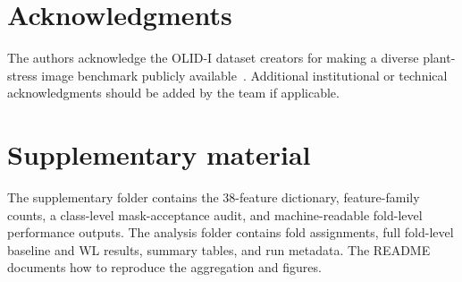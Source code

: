 \documentclass[conference]{IEEEtran}
\begin{document}


\section*{Acknowledgments}
The authors acknowledge the OLID-I dataset creators for making a diverse plant-stress image benchmark publicly available~\cite{Orka2023}. Additional institutional or technical acknowledgments should be added by the team if applicable.


\section*{Supplementary material}
The supplementary folder contains the 38-feature dictionary, feature-family counts, a class-level mask-acceptance audit, and machine-readable fold-level performance outputs. The analysis folder contains fold assignments, full fold-level baseline and WL results, summary tables, and run metadata. The README documents how to reproduce the aggregation and figures.
\end{document}
